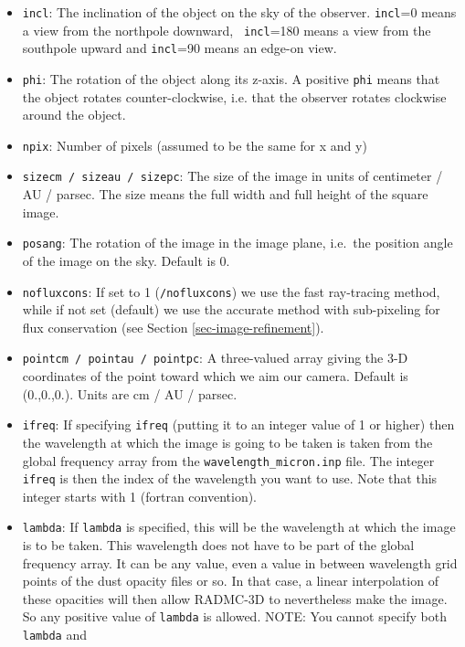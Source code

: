\documentclass{report}
\begin{document}
\begin{itemize}
\item[] {\small\tt incl}: The inclination of the object on the sky of the
  observer.  {\small\tt incl}=0 means a view from the northpole downward, {\small\tt
    incl}=180 means a view from the southpole upward and {\small\tt incl}=90 means
  an edge-on view.
\item[] {\small\tt phi}: The rotation of the object along its z-axis. A positive
  {\small\tt phi} means that the object rotates counter-clockwise, i.e. that the
  observer rotates clockwise around the object.
\item[] {\small\tt npix}: Number of pixels (assumed to be the same for x and y)
\item[] {\small\tt sizecm / sizeau / sizepc}: The size of the image in units of
  centimeter / AU / parsec. The size means the full width and full height of
  the square image. 
\item[] {\small\tt posang}: The rotation of the image in the image plane, i.e.\
  the position angle of the image on the sky. Default is 0.
\item[] {\small\tt nofluxcons}: If set to 1 ({\small\tt /nofluxcons}) we use the fast
  ray-tracing method, while if not set (default) we use the accurate method
  with sub-pixeling for flux conservation (see Section \ref{sec-image-refinement}).
\item[] {\small\tt pointcm / pointau / pointpc}: A three-valued array giving the
  3-D coordinates of the point toward which we aim our camera. Default is
  (0.,0.,0.). Units are cm / AU / parsec.
\item[] {\small\tt ifreq}: If specifying {\small\tt ifreq} (putting it to an integer
  value of 1 or higher) then the wavelength at which the image is going to
  be taken is taken from the global frequency array from the 
  {\small\tt wavelength\_micron.inp} file. The integer {\small\tt ifreq} is then the
  index of the wavelength you want to use. Note that this integer starts
  with 1 (fortran convention). 
\item[] {\small\tt lambda}: If {\small\tt lambda} is specified, this will be the
  wavelength at which the image is to be taken. This wavelength does not
  have to be part of the global frequency array. It can be any value, even a
  value in between wavelength grid points of the dust opacity files or
  so. In that case, a linear interpolation of these opacities will then
  allow RADMC-3D to nevertheless make the image. So any positive value of
  {\small\tt lambda} is allowed. NOTE: You cannot specify both {\small\tt lambda} and

\end{itemize}
\end{document}
